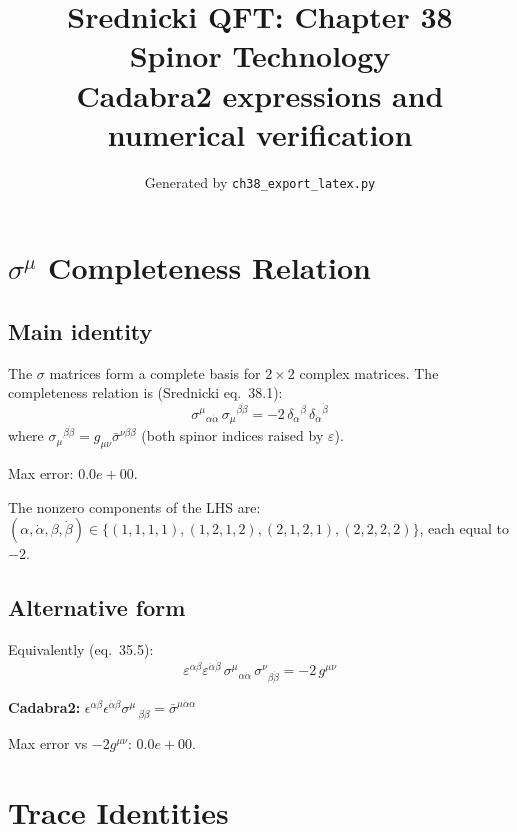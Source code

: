 \documentclass[12pt]{article}
\title{\textbf{Srednicki QFT: Chapter 38}\\[6pt]
       \large Spinor Technology\\[4pt]
       \normalsize Cadabra2 expressions and numerical verification}
\author{Generated by \texttt{ch38\_export\_latex.py}}
\date{}
\newcommand{\verified}[1]{\textcolor{verifygreen}{\checkmark\; #1}}
\newcommand{\dal}{\dot{\alpha}}
\newcommand{\dbe}{\dot{\beta}}
\begin{document}
\maketitle
\tableofcontents
\newpage

\section{\texorpdfstring{$\sigma^\mu$}{sigma} Completeness Relation}

\subsection{Main identity}

The $\sigma$ matrices form a complete basis for $2\times2$ complex matrices.
The completeness relation is (Srednicki eq.~38.1):
\begin{equation}
  \boxed{
    \sigma^\mu{}_{\alpha\dot\alpha}\,\sigma_\mu{}^{\beta\dot\beta}
    = -2\,\delta_\alpha{}^\beta\,\delta_{\dot\alpha}{}^{\dot\beta}
  }
  \tag{38.1}
\end{equation}
where $\sigma_\mu{}^{\beta\dot\beta} = g_{\mu\nu}\bar\sigma^{\nu\dot\beta\beta}$
(both spinor indices raised by $\varepsilon$).

\verified{Max error: $0.0e+00$.}

\medskip
The nonzero components of the LHS are:
$(\alpha,\dot\alpha,\beta,\dot\beta) \in
\{(1,1,1,1),(1,2,1,2),(2,1,2,1),(2,2,2,2)\}$, each equal to $-2$.

\subsection{Alternative form}

Equivalently (eq.~35.5):
\begin{equation}
  \varepsilon^{\alpha\beta}\varepsilon^{\dot\alpha\dot\beta}\,
  \sigma^\mu{}_{\alpha\dot\alpha}\,\sigma^\nu{}_{\beta\dot\beta}
  = -2\,g^{\mu\nu}
  \tag{35.5}
\end{equation}

\textbf{Cadabra2:} $\epsilon^{\alpha \beta} \epsilon^{\dal \dbe} \sigma^{\mu}\,_{\beta \dbe} = \bar\sigma^{\mu\dot\alpha\alpha}$

\verified{Max error vs $-2g^{\mu\nu}$: $0.0e+00$.}

\section{Trace Identities}
\end{document}
